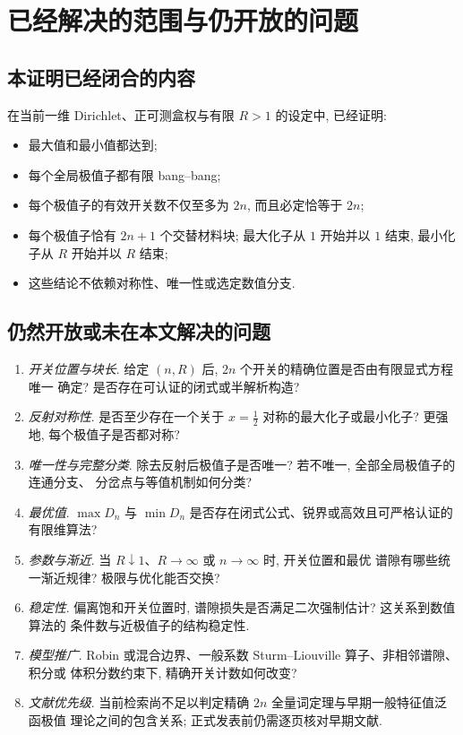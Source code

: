 \documentclass[UTF8]{ctexart}
\begin{document}
\section{已经解决的范围与仍开放的问题}
\subsection{本证明已经闭合的内容}

在当前一维 Dirichlet、正可测盒权与有限 $R>1$ 的设定中, 已经证明:
\begin{itemize}
	\item 最大值和最小值都达到;
	\item 每个全局极值子都有限 bang--bang;
	\item 每个极值子的有效开关数不仅至多为 $2n$, 而且必定恰等于 $2n$;
	\item 每个极值子恰有 $2n+1$ 个交替材料块; 最大化子从 $1$ 开始并以 $1$ 结束, 最小化子从
		$R$ 开始并以 $R$ 结束;
	\item 这些结论不依赖对称性、唯一性或选定数值分支.
\end{itemize}

\subsection{仍然开放或未在本文解决的问题}

\begin{enumerate}
	\item \emph{开关位置与块长}. 给定 $(n,R)$ 后, $2n$ 个开关的精确位置是否由有限显式方程唯一
		确定? 是否存在可认证的闭式或半解析构造?
	\item \emph{反射对称性}. 是否至少存在一个关于 $x=\tfrac12$ 对称的最大化子或最小化子? 更强地,
		每个极值子是否都对称?
	\item \emph{唯一性与完整分类}. 除去反射后极值子是否唯一? 若不唯一, 全部全局极值子的连通分支、
		分岔点与等值机制如何分类?
	\item \emph{最优值}. $\max D_n$ 与 $\min D_n$ 是否存在闭式公式、锐界或高效且可严格认证的
		有限维算法?
	\item \emph{参数与渐近}. 当 $R\downarrow1$、$R\to\infty$ 或 $n\to\infty$ 时, 开关位置和最优
		谱隙有哪些统一渐近规律? 极限与优化能否交换?
	\item \emph{稳定性}. 偏离饱和开关位置时, 谱隙损失是否满足二次强制估计? 这关系到数值算法的
		条件数与近极值子的结构稳定性.
	\item \emph{模型推广}. Robin 或混合边界、一般系数 Sturm--Liouville 算子、非相邻谱隙、积分或
		体积分数约束下, 精确开关计数如何改变?
	\item \emph{文献优先级}. 当前检索尚不足以判定精确 $2n$ 全量词定理与早期一般特征值泛函极值
		理论之间的包含关系; 正式发表前仍需逐页核对早期文献.
\end{enumerate}
\end{document}
